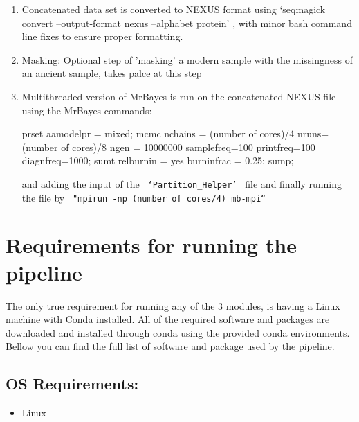\documentclass{book}
\begin{document}
\begin{enumerate}
\item Concatenated data set is converted to NEXUS format using ‘seqmagick convert --output-format nexus --alphabet protein’
, with minor bash command line fixes to ensure proper formatting.

\item Masking: Optional step of 'masking' a modern sample with the missingness of an ancient sample, takes palce at this step



\item Multithreaded version of MrBayes is run on the concatenated NEXUS file using the MrBayes commands:

\begin{spverbatim}
prset aamodelpr = mixed;
mcmc nchains = (number of cores)/4 nruns=(number of cores)/8 ngen = 10000000 samplefreq=100 printfreq=100 diagnfreq=1000;
sumt relburnin = yes burninfrac = 0.25;
sump;
\end{spverbatim}
and adding the input of the \verb| ‘Partition_Helper’ | file and finally running the file by
\verb| "mpirun -np (number of cores/4) mb-mpi“ |


\end{enumerate}


















\clearpage

\section{\Large Requirements for running the pipeline}

The only true requirement for running any of the 3 modules, is having a Linux machine with Conda installed.
All of the required software and packages are downloaded and installed through conda using the provided conda environments. Bellow you can find the full list of software and package used by the pipeline.

\subsection{OS Requirements:}
\begin{itemize}	
\item Linux
\end{itemize}
\end{document}
